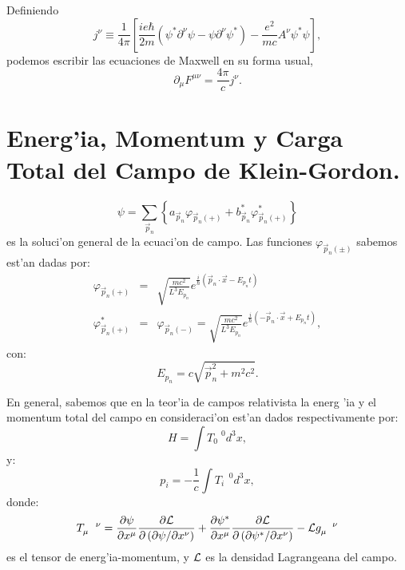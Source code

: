 Definiendo 
\begin{equation}
j^{\nu }\equiv \frac{1}{4\pi }\left[ \frac{ie\hbar }{2m}\left( \psi ^{\ast
}\partial ^{\nu }\psi -\psi \partial ^{\nu }\psi ^{\ast }\right) -\frac{e^{2}%
}{mc}A^{\nu }\psi ^{\ast }\psi \right] , \label{JotaNu}
\end{equation}
podemos escribir las ecuaciones de Maxwell en su forma usual, 
\begin{equation}
\partial _{\mu }F^{\mu \nu }=\frac{4\pi }{c}j^{\nu }. \label{Maxwell}
\end{equation}


\section{Energ'ia, Momentum y Carga Total del Campo de Klein-Gordon.}

\begin{equation}
\psi =\sum_{\vec{p}_{n}}\left\{ a_{\vec{p}_{n}}\varphi _{\vec{p}_{n}\left(
+\right) }+b_{\vec{p}_{n}}^{\ast }\varphi _{\vec{p}_{n}\left( +\right)
}^{\ast }\right\}   \label{Solucion General}
\end{equation}%
es la soluci'on general de la ecuaci'on de campo. Las funciones $%
\varphi _{\vec{p}_{n}\left( \pm \right) }$ sabemos est'an dadas por:%
\begin{eqnarray}
\varphi _{\vec{p}_{n}\left( +\right) } &=&\sqrt{\frac{mc^{2}}{L^{3}E_{p_{n}}}%
}e^{\frac{i}{\hbar }\left( \vec{p}_{n}\cdot \vec{x}-E_{p_{n}}t\right) }
\label{Phi(+-)} \\
\varphi _{\vec{p}_{n}\left( +\right) }^{\ast } &=&\varphi _{\vec{p}%
_{n}\left( -\right) }=\sqrt{\frac{mc^{2}}{L^{3}E_{p_{n}}}}e^{\frac{i}{\hbar }%
\left( -\vec{p}_{n}\cdot \vec{x}+E_{p_{n}}t\right) },
\end{eqnarray}%
con:%
\begin{equation}
E_{p_{n}}=c\sqrt{\vec{p}_{n}^{2}+m^{2}c^{2}}.  \label{Epn}
\end{equation}


En general, sabemos que en la teor'ia de campos relativista la energ%
'ia y el momentum total del campo en consideraci'on est'an dados
respectivamente por:%
\begin{equation}
H=\int T_{0}^{\quad 0}d^{3}x,  \label{Energia Total}
\end{equation}%
y:%
\begin{equation}
p_{i}=-\frac{1}{c}\int T_{i}^{\quad 0}d^{3}x,  \label{Momentum Total}
\end{equation}%
donde:%
\begin{equation}
T_{\mu }^{\quad \nu }=\frac{\partial \psi }{\partial x^{\mu }}\frac{\partial
{\cal L}}{\partial \left( \partial \psi /\partial x^{\nu }\right) }+\frac{%
\partial \psi ^{\ast }}{\partial x^{\mu }}\frac{\partial {\cal L}}{\partial
\left( \partial \psi ^{\ast }/\partial x^{\nu }\right) }-{\cal L}g_{\mu
}^{\quad \nu }  \label{Tensor Energia-Momentum}
\end{equation}%
es el tensor de energ'ia-momentum, y ${\cal L}$ es la densidad
Lagrangeana del campo.


